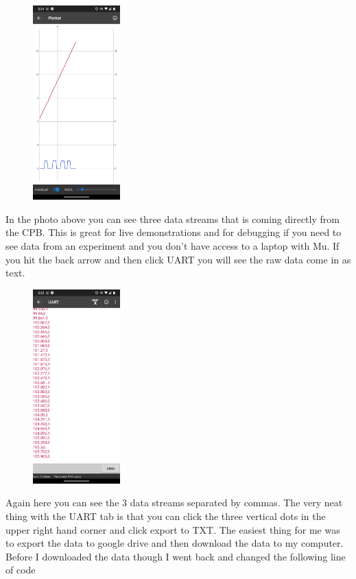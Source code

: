 \begin{figure}[H]
  \begin{center}
    \includegraphics[width=0.3\textwidth]{Figures/phoneapp3.png}
  \end{center}
\end{figure}
In the photo above you can see three data streams that is coming directly from the CPB. This is great for live demonstrations and for debugging if you need to see data from an experiment and you don't have access to a laptop with Mu. If you hit the back arrow and then click UART you will see the raw data come in as text.
\begin{figure}[H]
  \begin{center}
    \includegraphics[width=0.3\textwidth]{Figures/phoneapp4.png}
  \end{center}
\end{figure}
Again here you can see the 3 data streams separated by commas. The very neat thing with the UART tab is that you can click the three vertical dots in the upper right hand corner and click export to TXT. The easiest thing for me was to export the data to google drive and then download the data to my computer. Before I downloaded the data though I went back and changed the following line of code
